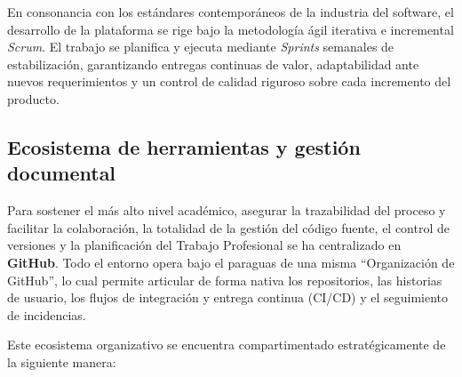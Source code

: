 En consonancia con los estándares contemporáneos de la industria del software, el desarrollo de la plataforma se rige bajo la metodología ágil iterativa e incremental \textit{Scrum}. El trabajo se planifica y ejecuta mediante \textit{Sprints} semanales de estabilización, garantizando entregas continuas de valor, adaptabilidad ante nuevos requerimientos y un control de calidad riguroso sobre cada incremento del producto.

\newpage

\subsection{Ecosistema de herramientas y gestión documental}

Para sostener el más alto nivel académico, asegurar la trazabilidad del proceso y facilitar la colaboración, la totalidad de la gestión del código fuente, el control de versiones y la planificación del Trabajo Profesional se ha centralizado en \textbf{GitHub}. Todo el entorno opera bajo el paraguas de una misma ``Organización de GitHub'', lo cual permite articular de forma nativa los repositorios, las historias de usuario, los flujos de integración y entrega continua (CI/CD) y el seguimiento de incidencias.

Este ecosistema organizativo se encuentra compartimentado estratégicamente de la siguiente manera:


